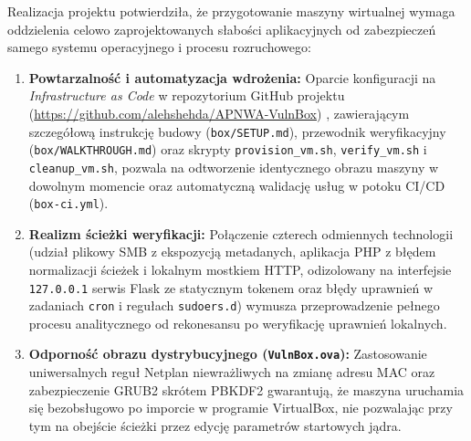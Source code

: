 Realizacja projektu potwierdziła, że przygotowanie maszyny wirtualnej wymaga oddzielenia celowo zaprojektowanych słabości aplikacyjnych od zabezpieczeń samego systemu operacyjnego i procesu rozruchowego:
\begin{enumerate}
    \item \textbf{Powtarzalność i automatyzacja wdrożenia:} Oparcie konfiguracji na \textit{Infrastructure as Code} w repozytorium GitHub projektu (\url{https://github.com/alehshehda/APNWA-VulnBox}) \cite{vulnbox_repo}, zawierającym szczegółową instrukcję budowy (\texttt{box/SETUP.md}), przewodnik weryfikacyjny (\texttt{box/WALKTHROUGH.md}) oraz skrypty \texttt{provision\_vm.sh}, \texttt{verify\_vm.sh} i \texttt{cleanup\_vm.sh}, pozwala na odtworzenie identycznego obrazu maszyny w dowolnym momencie oraz automatyczną walidację usług w potoku CI/CD (\texttt{box-ci.yml}).
    \item \textbf{Realizm ścieżki weryfikacji:} Połączenie czterech odmiennych technologii (udział plikowy SMB z ekspozycją metadanych, aplikacja PHP z błędem normalizacji ścieżek i lokalnym mostkiem HTTP, odizolowany na interfejsie \texttt{127.0.0.1} serwis Flask ze statycznym tokenem oraz błędy uprawnień w zadaniach \texttt{cron} i regułach \texttt{sudoers.d}) wymusza przeprowadzenie pełnego procesu analitycznego od rekonesansu po weryfikację uprawnień lokalnych.
    \item \textbf{Odporność obrazu dystrybucyjnego (\texttt{VulnBox.ova}):} Zastosowanie uniwersalnych reguł Netplan niewrażliwych na zmianę adresu MAC oraz zabezpieczenie GRUB2 skrótem PBKDF2 gwarantują, że maszyna uruchamia się bezobsługowo po imporcie w programie VirtualBox, nie pozwalając przy tym na obejście ścieżki przez edycję parametrów startowych jądra.
\end{enumerate}
